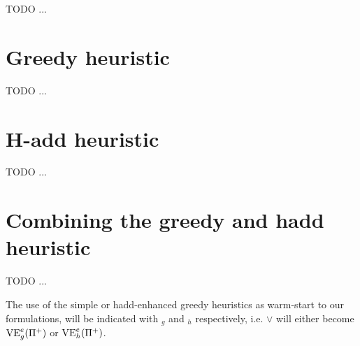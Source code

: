 TODO ...

\section{Greedy heuristic}
TODO ...

\section{H-add heuristic}
TODO ...

\section{Combining the greedy and hadd heuristic}
TODO ...

The use of the simple or hadd-enhanced greedy heuristics as warm-start to our formulations, will be indicated with $_g$ and $_h$ respectively, i.e. $\vee$ will either become $\mbox{VE}^e_g(\Pi^+)$ or $\mbox{VE}^e_h(\Pi^+)$.
